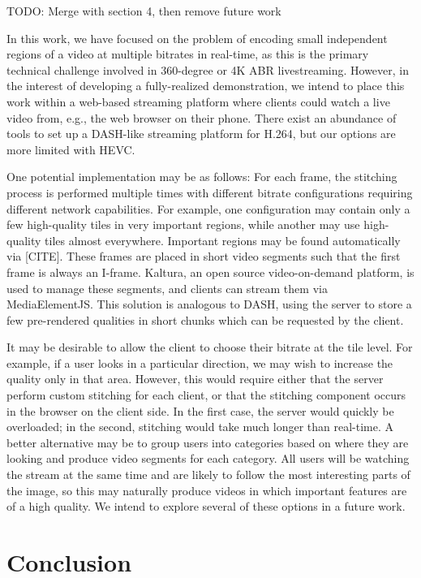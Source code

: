 TODO: Merge with section 4, then remove future work

In this work, we have focused on the problem of encoding small independent regions of a video at multiple bitrates in real-time, as this is the primary technical challenge involved in 360-degree or 4K ABR livestreaming. However, in the interest of developing a fully-realized demonstration, we intend to place this work within a web-based streaming platform where clients could watch a live video from, e.g., the web browser on their phone. There exist an abundance of tools to set up a DASH-like streaming platform for H.264, but our options are more limited with HEVC.

One potential implementation may be as follows: For each frame, the stitching process is performed multiple times with different bitrate configurations requiring different network capabilities. For example, one configuration may contain only a few high-quality tiles in very important regions, while another may use high-quality tiles almost everywhere. Important regions may be found automatically via [CITE]. These frames are placed in short video segments such that the first frame is always an I-frame. Kaltura, an open source video-on-demand platform, is used to manage these segments, and clients can stream them via MediaElementJS. This solution is analogous to DASH, using the server to store a few pre-rendered qualities in short chunks which can be requested by the client.

It may be desirable to allow the client to choose their bitrate at the tile level. For example, if a user looks in a particular direction, we may wish to increase the quality only in that area. However, this would require either that the server perform custom stitching for each client, or that the stitching component occurs in the browser on the client side. In the first case, the server would quickly be overloaded; in the second, stitching would take much longer than real-time. A better alternative may be to group users into categories based on where they are looking and produce video segments for each category. All users will be watching the stream at the same time and are likely to follow the most interesting parts of the image, so this may naturally produce videos in which important features are of a high quality. We intend to explore several of these options in a future work.

\section{Conclusion} \label{concl}

